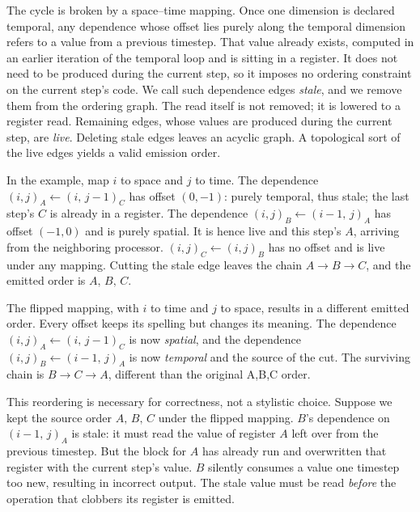 \documentclass[sigplan, nonacm]{acmart}
\begin{document}
The cycle is broken by a space--time mapping. Once one dimension is declared
temporal, any dependence whose offset lies purely along the temporal
dimension refers to a value from a previous timestep. That value
already exists,  computed in an earlier iteration of the temporal loop
and is sitting in a register. It does not need to be produced during the
current step, so it imposes no ordering constraint on the current step's
code. We call such dependence edges \emph{stale}, and we remove them from the
ordering graph. The read itself is not removed; it is lowered to a
register read. Remaining edges, whose values are  produced during the current step,
are \emph{live}. Deleting stale edges leaves an acyclic graph. A
topological sort of the live edges yields a valid emission order.

In the example, map $i$ to space and $j$ to time. The dependence
$(i,j)_A \leftarrow (i,\,j{-}1)_{C}$ has offset $(0,-1)$: purely temporal, thus 
stale; the last step's $C$ is already in a register. The dependence
$(i,j)_{B} \leftarrow (i{-}1,\,j)_{A}$ has offset $(-1,0)$ and is purely spatial. It is hence live and this step's $A$, arriving from the neighboring processor. $(i,j)_C \leftarrow (i,j)_{B}$ has no offset and is live under any
mapping. Cutting the stale edge leaves the chain $A \to B \to C$, and the
emitted order is $A,\,B,\,C$.


The flipped mapping, with $i$ to time and $j$ to space, results in a different emitted order. Every offset keeps its
spelling but changes its meaning. The dependence $(i,j)_A \leftarrow (i,\,j{-}1)_{C}$  is now
\emph{spatial}, and the dependence  $(i,j)_B \leftarrow (i{-}1,\,j)_{A}$ is now \emph{temporal} and the source of the cut. %
The surviving chain is $B \to C \to A$, different than the original A,B,C order.

This reordering is necessary for correctness, not a stylistic choice. Suppose
we kept the source order $A,\,B,\,C$ under the flipped mapping. $B$'s
dependence on $(i{-}1,\,j)_{A}$ is stale: it must read the value of register
$A$ left over from the previous timestep. But the block for $A$ has
already run and overwritten that register with the current step's
value. $B$ silently consumes a value one timestep too new, resulting in incorrect output. The stale value must be read \emph{before} the operation that clobbers its register is emitted.
\end{document}
